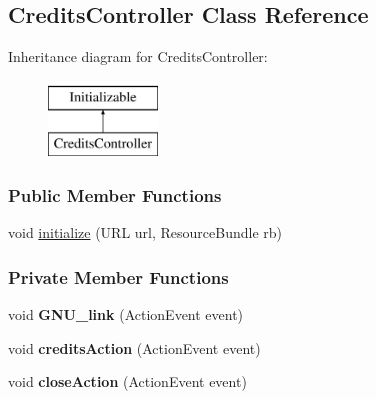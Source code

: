 \hypertarget{classCreditsController}{}\subsection{Credits\+Controller Class Reference}
\label{classCreditsController}
Inheritance diagram for Credits\+Controller\+:\begin{figure}[H]
\begin{center}
\leavevmode
\includegraphics[height=2.000000cm]{classCreditsController}
\end{center}
\end{figure}
\subsubsection*{Public Member Functions}
\begin{DoxyCompactItemize}
\item 
void \hyperlink{classCreditsController_a30a25651d36cbea8bd963e42a908696b}{initialize} (U\+RL url, Resource\+Bundle rb)
\end{DoxyCompactItemize}
\subsubsection*{Private Member Functions}
\begin{DoxyCompactItemize}
\item 
\mbox{\label{classCreditsController_ad2471eb9d891808a506153dac6cd9a49}} 
void {\bfseries G\+N\+U\+\_\+link} (Action\+Event event)
\item 
\mbox{\label{classCreditsController_a5ad87d6f7f05dbb9a9b021fbb5e87000}} 
void {\bfseries credits\+Action} (Action\+Event event)
\item 
\mbox{\label{classCreditsController_ad6d0c65f9f954ebc1381ade993e6cfb6}} 
void {\bfseries close\+Action} (Action\+Event event)
\end{DoxyCompactItemize}
